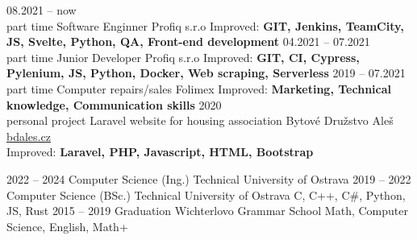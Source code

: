 \documentclass[9pt]{developercv} %
\begin{document}
\begin{center}
\end{center}



\begin{entrylist}
	\entry
		{08.2021 -- now\\\footnotesize{part time}}
		{Software Enginner}
		{Profiq s.r.o}
		{Improved: \textbf{GIT, Jenkins, TeamCity, JS, Svelte, Python, QA, Front-end development}}
	\entry
		{04.2021 -- 07.2021\\\footnotesize{part time}}
		{Junior Developer}
		{Profiq s.r.o}
		{Improved: \textbf{GIT, CI, Cypress, Pylenium, JS, Python, Docker, Web scraping, Serverless}}
	\entry
		{2019 -- 07.2021\\\footnotesize{part time}}
		{Computer repairs/sales}
		{Folimex}
		{Improved: \textbf{Marketing, Technical knowledge, Communication skills}}
	\entry
		{2020\\\footnotesize{personal project}}
		{Laravel website for housing association}
		{Bytové Družstvo Aleš}
		{\href{www.bdales.cz}{bdales.cz}\\Improved: \textbf{Laravel, PHP, Javascript, HTML, Bootstrap}}
\end{entrylist}



\begin{entrylist}
	\entry
		{2022 -- 2024}
		{Computer Science (Ing.)}
		{Technical University of Ostrava}
		{}
	\entry
		{2019 -- 2022}
		{Computer Science (BSc.)}
		{Technical University of Ostrava}
		{C, C++, C\#, Python, JS, Rust}
	\entry
		{2015 -- 2019}
		{Graduation}
		{Wichterlovo Grammar School}
		{Math, Computer Science, English, Math+}
\end{entrylist}

\end{document}
